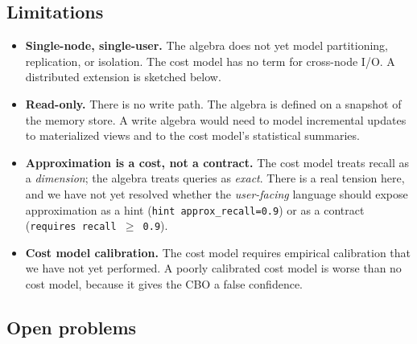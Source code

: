 \documentclass[sigconf,nonacm,review]{acmart}
\theoremstyle{plain}
\theoremstyle{definition}
\theoremstyle{remark}
\begin{document}
\subsection{Limitations}\label{sec:discuss:limitations}

\begin{itemize}[leftmargin=*]
  \item \textbf{Single-node, single-user.} The algebra does not yet
    model partitioning, replication, or isolation. The cost model has
    no term for cross-node I/O. A distributed extension is sketched
    below.
  \item \textbf{Read-only.} There is no write path. The algebra is
    defined on a snapshot of the memory store. A write algebra
    would need to model incremental updates to materialized views
    and to the cost model's statistical summaries.
  \item \textbf{Approximation is a cost, not a contract.} The cost
    model treats recall as a \emph{dimension}; the algebra treats
    queries as \emph{exact}. There is a real tension here, and we
    have not yet resolved whether the \emph{user-facing} language
    should expose approximation as a hint (\texttt{hint
    approx\_recall=0.9}) or as a contract (\texttt{requires recall
    $\geq$ 0.9}).
  \item \textbf{Cost model calibration.} The cost model requires
    empirical calibration that we have not yet performed. A poorly
    calibrated cost model is worse than no cost model, because it
    gives the CBO a false confidence.
\end{itemize}

\subsection{Open problems}\label{sec:discuss:open}
\end{document}
